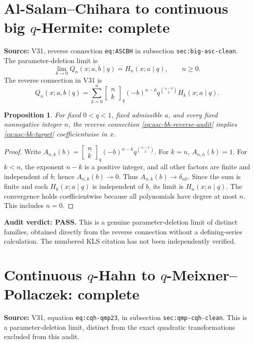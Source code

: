 \documentclass[11pt]{article}
\newtheorem{proposition}{Proposition}
\begin{document}
\section{Al-Salam--Chihara to continuous big $q$-Hermite: complete}
\noindent\textbf{Source:} V31, reverse connection \texttt{eq:ASCBH} in subsection \texttt{sec:big-asc-clean}. The parameter-deletion limit is
\begin{equation}\label{eq:asc-bh-target}
 \lim_{b\to0}Q_n(x;a,b\mid q)=H_n(x;a\mid q),\qquad n\ge0.
\end{equation}
The reverse connection in V31 is
\begin{equation}\label{eq:asc-bh-reverse-audit}
 Q_n(x;a,b\mid q)=\sum_{k=0}^{n}
 \begin{bmatrix}n\\k\end{bmatrix}_q
 (-b)^{n-k}q^{\binom{n-k}{2}}H_k(x;a\mid q).
\end{equation}
\begin{proposition}
For fixed $0<q<1$, fixed admissible $a$, and every fixed nonnegative integer $n$, the reverse connection \eqref{eq:asc-bh-reverse-audit} implies \eqref{eq:asc-bh-target} coefficientwise in $x$.
\end{proposition}
\begin{proof}
Write $A_{n,k}(b)=\begin{bmatrix}n\\k\end{bmatrix}_q(-b)^{n-k}q^{\binom{n-k}{2}}$. For $k=n$, $A_{n,n}(b)=1$. For $k<n$, the exponent $n-k$ is a positive integer, and all other factors are finite and independent of $b$; hence $A_{n,k}(b)\to0$. Thus $A_{n,k}(b)\to\delta_{nk}$. Since the sum is finite and each $H_k(x;a\mid q)$ is independent of $b$, its limit is $H_n(x;a\mid q)$. The convergence holds coefficientwise because all polynomials have degree at most $n$. This includes $n=0$.
\end{proof}
\noindent\textbf{Audit verdict: PASS.} This is a genuine parameter-deletion limit of distinct families, obtained directly from the reverse connection without a defining-series calculation. The numbered KLS citation has not been independently verified.


\section{Continuous $q$-Hahn to $q$-Meixner--Pollaczek: complete}
\noindent\textbf{Source:} V31, equation \texttt{eq:cqh-qmp23}, in subsection \texttt{sec:qmp-cqh-clean}. This is a parameter-deletion limit, distinct from the exact quadratic transformations excluded from this audit.
\end{document}
